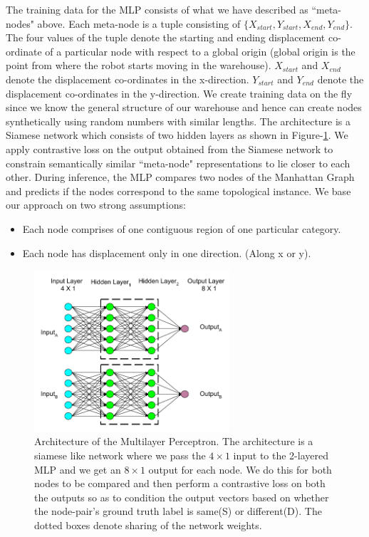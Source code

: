 \documentclass[letterpaper, 10 pt, conference]{ieeeconf}  %
\begin{document}
	The training data for the MLP consists of what we have described as ``meta-nodes" above. Each meta-node is a tuple consisting of $\{X_{start}, Y_{start}, X_{end}, Y_{end}\}$. The four values of the tuple denote the starting and ending displacement co-ordinate of a particular node with respect to a global origin (global origin is the point from where the robot starts moving in the warehouse). $X_{start}$ and $X_{end}$ denote the displacement co-ordinates in the x-direction. $Y_{start}$ and $Y_{end}$ denote the displacement co-ordinates in the y-direction. We create training data on the fly since we know the general structure of our warehouse and hence can create nodes synthetically using random numbers with similar lengths. The architecture is a Siamese network \cite{bromley1994signature} which consists of two hidden layers as shown in Figure-\ref{fig:MLP_fig}. We apply contrastive loss on the output obtained from the Siamese network to constrain semantically similar ``meta-node" representations to lie closer to each other. During inference, the MLP compares two nodes of the Manhattan Graph and predicts if the nodes correspond to the same topological instance. We base our approach on two strong assumptions:
	\begin{itemize}
		\item Each node comprises of one contiguous region of one particular category.
		\item Each node has displacement only in one direction. (Along x or y). 
	\end{itemize}
	\begin{figure}
		\centering
		\includegraphics[width=\linewidth, height=6cm]{pic/mlp_architecture.png}
		\caption{Architecture of the Multilayer Perceptron. The architecture is a siamese like network where we pass the $4 \times 1$ input to the 2-layered MLP and we get an $8 \times 1$ output for each node. We do this for both nodes to be compared and then perform a contrastive loss on both the outputs so as to condition the output vectors based on whether the node-pair's ground truth label is same(S) or different(D). The dotted boxes denote sharing of the network weights.}
		\label{fig:MLP_fig}
		
	\end{figure}
	
\end{document}
